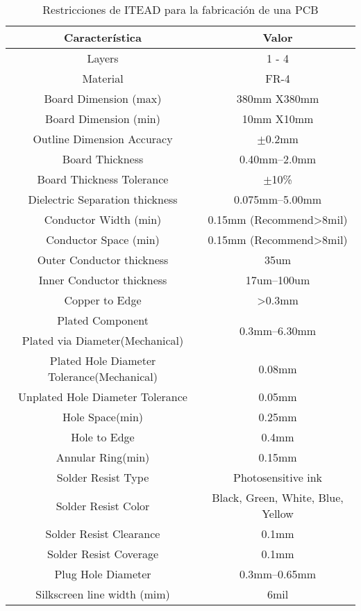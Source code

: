 \begin{table} [H]
\centering
\begin{tabular}{|c|c|}
\hline 
\textbf{Característica} & \textbf{Valor} \\
\hline 
Layers &	1 - 4 \\
\hline 
Material & 	FR-4 \\
\hline 
Board Dimension (max) & 	380mm X380mm \\
\hline 
Board Dimension (min) &	10mm X10mm \\
\hline 
Outline Dimension Accuracy &  $\pm$0.2mm \\
\hline 
Board Thickness & 	0.40mm--2.0mm \\
\hline 
Board Thickness Tolerance &	 $\pm$10\% \\
\hline 
Dielectric Separation thickness &	0.075mm--5.00mm \\
\hline 
Conductor Width (min) &	0.15mm (Recommend>8mil) \\
\hline 
Conductor Space (min) &	0.15mm (Recommend>8mil) \\
\hline 
Outer Conductor thickness &	35um \\
\hline 
Inner Conductor thickness &	17um--100um \\
\hline 
Copper to Edge &	>0.3mm \\
\hline 
Plated Component &	 \multirow{2}{*}{0.3mm--6.30mm} \\
Plated via Diameter(Mechanical) & \\
\hline 
Plated Hole Diameter Tolerance(Mechanical) &	0.08mm \\
\hline 
Unplated Hole Diameter Tolerance &	0.05mm \\
\hline 
Hole Space(min) &	0.25mm \\
\hline 
Hole to Edge &	0.4mm \\
\hline 
Annular Ring(min) &	0.15mm \\
\hline 
Solder Resist Type & 	Photosensitive ink \\
\hline 
Solder Resist Color &	Black, Green, White, Blue, Yellow \\
\hline 
Solder Resist Clearance &	0.1mm \\
\hline 
Solder Resist Coverage &	0.1mm \\
\hline 
Plug Hole Diameter &	0.3mm--0.65mm \\
\hline 
Silkscreen line width (mim) &	6mil \\
\hline 
\end{tabular} 
\caption{Restricciones de ITEAD para la fabricación de una PCB}
\label{tab:ITEAD}
\end{table}

